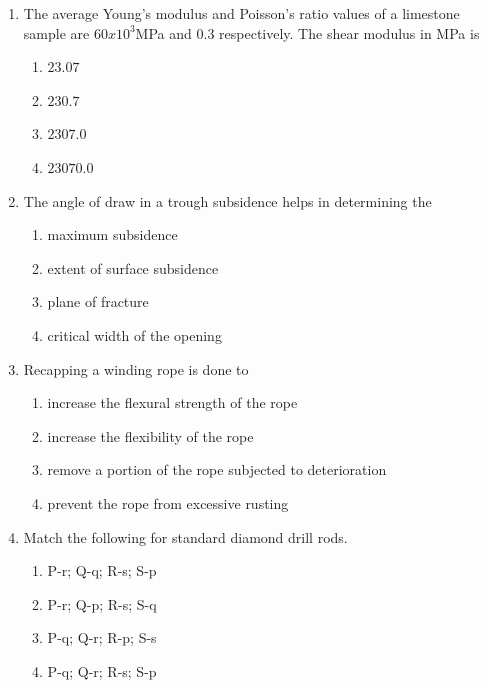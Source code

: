 \documentclass[journal,12pt,onecolumn]{IEEEtran}
\theoremstyle{remark}
\begin{document}
\begin{enumerate}
 \item The average Young's modulus and Poisson's ratio values of a limestone sample are $60 x 10^3$MPa
and $0.3$ respectively. The shear modulus in MPa is
\hfill{}
\begin{multicols}{4}
\begin{enumerate}
\item $23.07$
\item $230.7$
\item $2307.0$
\item $23070.0$
\end{enumerate}
\end{multicols}

\item The angle of draw in a trough subsidence helps in determining the

\hfill{}
\begin{multicols}{2}
\begin{enumerate}
\item maximum subsidence
\item extent of surface subsidence
\item plane of fracture
\item critical width of the opening
\end{enumerate}
\end{multicols}

\item Recapping a winding rope is done to

\hfill{}
\begin{enumerate}
\item increase the flexural strength of the rope
\item increase the flexibility of the rope
\item remove a portion of the rope subjected to deterioration
\item  prevent the rope from excessive rusting
\end{enumerate}

\item Match the following for standard diamond drill rods.
\vspace{0.5em}

\hfill{}
\begin{table}[H]

\end{table}
\begin{multicols}{2}
\begin{enumerate}
\item P-r; Q-q; R-s; S-p  
\item P-r; Q-p; R-s; S-q  
\item P-q; Q-r; R-p; S-s  
\item P-q; Q-r; R-s; S-p  
\end{enumerate}
\end{multicols}


\end{enumerate}
\end{document}
